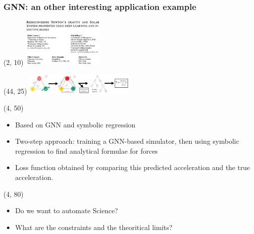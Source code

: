 \begin{frame}
  \frametitle{GNN: an other interesting application example}
  \begin{textblock}{40}(2, 10)
    \includegraphics[width=150px]{img/retrieve_gravitation_laws_1.png}
  \end{textblock}
  \begin{textblock}{56}(44, 25)
    \includegraphics[width=200px]{img/retrieve_gravitation_laws_2.png}
  \end{textblock}
  \begin{textblock}{80}(4, 50)
    \begin{itemize}
      \item Based on GNN and symbolic regression
      \item Two-step approach: training a GNN-based simulator, then using symbolic regression to find analytical formulae for forces
      \item Loss function obtained by comparing this predicted acceleration and the true acceleration.
    \end{itemize}
  \end{textblock}

  \begin{textblock}{80}(4, 80)
    \begin{itemize}
      \item Do we want to automate Science? 
      \item What are the constraints and the theoritical limits? 
    \end{itemize}
  \end{textblock}

  

\end{frame}


